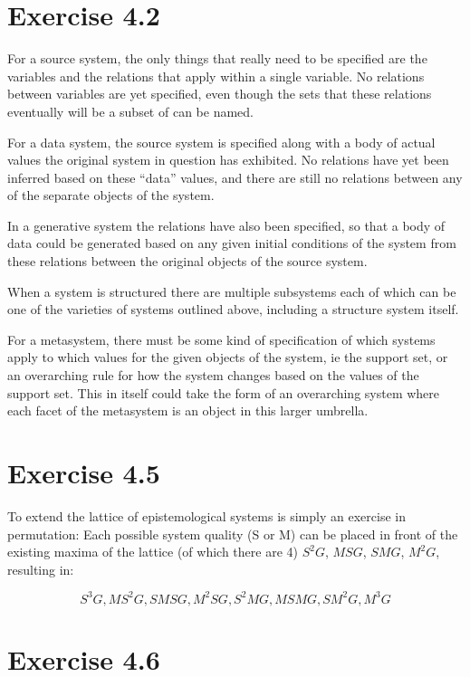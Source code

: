 \documentclass[12pt]{article}
\begin{document}
\maketitle

\section{Exercise 4.2}

For a source system, the only things that really need to be specified are the variables and the relations that apply within a single variable.  No relations between variables are yet specified, even though the sets that these relations eventually will be a subset of can be named.  

For a data system, the source system is specified along with a body of actual values the original system in question has exhibited.  No relations have yet been inferred based on these ``data'' values, and there are still no relations between any of the separate objects of the system.

In a generative system the relations have also been specified, so that a body of data could be generated based on any given initial conditions of the system from these relations between the original objects of the source system.  

When a system is structured there are multiple subsystems each of which can be one of the varieties of systems outlined above, including a structure system itself.  

For a metasystem, there must be some kind of specification of which systems apply to which values for the given objects of the system, ie the support set, or an overarching rule for how the system changes based on the values of the support set.  This in itself could take the form of an overarching system where each facet of the metasystem is an object in this larger umbrella.  

\section{Exercise 4.5}

To extend the lattice of epistemological systems is simply an exercise in permutation: Each possible system quality (S or M) can be placed in front of the existing maxima of the lattice (of which there are 4) $S^2G$, $MSG$, $SMG$, $M^2G$, resulting in:

$$ S^3G,MS^2G,SMSG,M^2SG,S^2MG,MSMG,SM^2G,M^3G $$

\section{Exercise 4.6}
\end{document}
